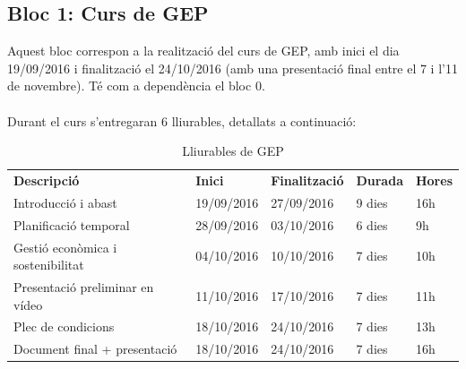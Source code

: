 	\subsection{Bloc 1: Curs de GEP}
		Aquest bloc correspon a la realització del curs de GEP, amb inici el dia 19/09/2016 i finalització el 24/10/2016 (amb una presentació final entre el 7 i l'11 de novembre).
		Té com a dependència el bloc 0.\\\\
		Durant el curs s'entregaran 6 lliurables, detallats a continuació:\\
		\begin{table}[H]
			\begin{center}
				\begin{tabular}{p{5cm} !{\vrule width -1pt}x{2.1cm} !{\vrule width -1pt}x{2.4cm} !{\vrule width -1pt}x{1.6cm} !{\vrule width -1pt}x{1.6cm}}
				\textbf{Descripció} & \textbf{Inici} & \textbf{Finalització} & \textbf{Durada} & \textbf{Hores} \\
				Introducció i abast & 19/09/2016 & 27/09/2016 & 9 dies & 16h \\
				Planificació temporal & 28/09/2016 & 03/10/2016 & 6 dies & 9h \\
				Gestió econòmica i sostenibilitat & 04/10/2016 & 10/10/2016 & 7 dies & 10h \\
				Presentació preliminar en vídeo & 11/10/2016 & 17/10/2016 & 7 dies & 11h \\
				Plec de condicions & 18/10/2016 & 24/10/2016 & 7 dies & 13h \\
				Document final + presentació & 18/10/2016 & 24/10/2016 & 7 dies & 16h
				\end{tabular}
			\end{center}
			\caption{Lliurables de GEP}
		\end{table}

